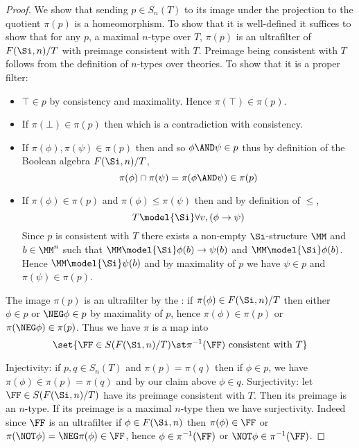 \begin{proof}
    We show that sending $p \in S_n(T)$ to its image under the projection 
    to the quotient $\pi(p)$ is a homeomorphism.
    To show that it is well-defined it suffices to show that for any $p$, a 
    maximal $n$-type over $T$, $\pi(p)$ is an ultrafilter of $F(\Si,n) / T$
    with preimage consistent with $T$.
    Preimage being consistent with $T$ 
    follows from the definition of $n$-types over theories.
    To show that it is a proper filter:
    \begin{itemize}
        \item $\top \in p$ by consistency and maximality. 
            Hence $\pi(\top) \in \pi(p)$.
        \item If $\pi(\bot) \in \pi(p)$ then
            which is a contradiction with consistency.
        \item If $\pi(\phi), \pi(\psi) \in \pi(p)$ then 
             and so
            $\phi \AND \psi \in p$ thus by definition of the Boolean algebra 
            $F(\Si,n) / T$, 
            \[\pi(\phi) \cap \pi(\psi) = \pi(\phi \AND \psi) \in \pi(p)\]
        \item If $\pi(\phi) \in \pi(p)$ and $\pi(\phi) \leq \pi(\psi)$ then 
            and by definition of $\leq$,
            \[T \model{\Si} \forall v, (\phi \to \psi)\]
            Since $p$ is consistent with $T$ there exists a non-empty
            $\Si$-structure $\MM$ and $b \in {\MM}^n$ such that 
            $\MM \model{\Si} \phi(b) \to \psi(b)$ and $\MM \model{\Si} \phi(b)$.
            Hence $\MM \model{\Si} \psi(b)$ and by maximality of $p$ we have 
            $\psi \in p$ and $\pi(\psi) \in \pi(p)$.
    \end{itemize}
    The image $\pi(p)$ is an ultrafilter by the 
    :
    if $\pi(\phi) \in F(\Si,n) / T$ then either 
    $\phi \in p$ or $\NEG \phi \in p$ by maximality of $p$, 
    hence $\pi(\phi) \in \pi(p)$ or $\pi(\NEG \phi) \in \pi(p)$.
    Thus we have $\pi$ is a map into \[
    \set{\FF \in S(F(\Si,n) / T) \st \pi^{-1}(\FF) \text{ consistent with } T}\]

    Injectivity: if $p,q \in S_n(T)$ and $\pi(p) = \pi(q)$ then 
    if $\phi \in p$, we have $\pi(\phi) \in \pi(p) = \pi(q)$ and by our 
    claim above $\phi \in q$.
    Surjectivity: let $\FF \in S(F(\Si,n) / T)$ 
    have its preimage consistent with $T$.
    Then its preimage is an $n$-type.
    If its preimage is a maximal $n$-type then we have surjectivity.
    Indeed since $\FF$ is an ultrafilter if $\phi \in F(\Si,n)$ then 
    $\pi(\phi) \in \FF$ or $\pi(\NOT \phi) = \NEG \pi(\phi) \in \FF$,
    hence $\phi \in \pi^{-1}(\FF)$ or $\NOT \phi \in \pi^{-1}(\FF)$.


\end{proof}
